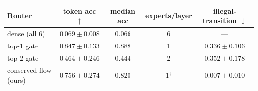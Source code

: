\begin{tabular}{lcccc}
\toprule
Router & token acc $\uparrow$ & median acc & experts/layer & illegal-transition $\downarrow$ \\
\midrule
dense (all 6) & $0.069\pm0.008$ & $0.066$ & 6 & --- \\
top-$1$ gate & $0.847\pm0.133$ & $0.888$ & 1 & $0.336\pm0.106$ \\
top-$2$ gate & $0.464\pm0.246$ & $0.444$ & 2 & $0.352\pm0.178$ \\
conserved flow (ours) & $0.756\pm0.274$ & $0.820$ & 1$^\dagger$ & $0.007\pm0.010$ \\
\bottomrule
\end{tabular}
